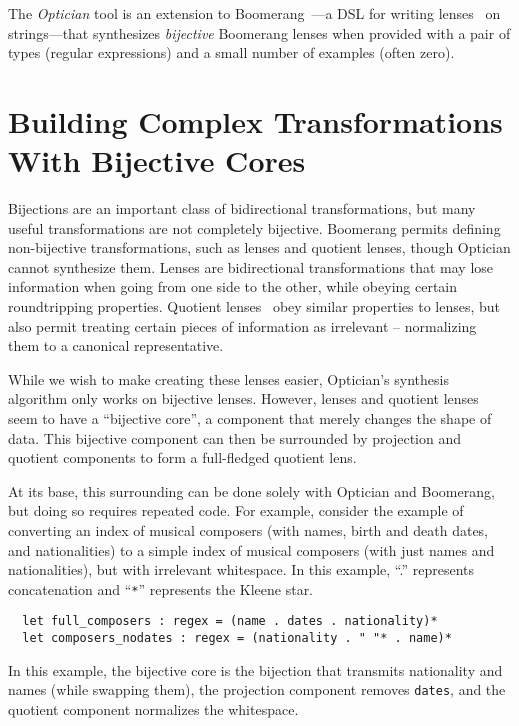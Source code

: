 \documentclass[a4paper]{article}
\begin{document}
The {\em Optician} tool is an extension to Boomerang~\cite{boomerang}---a
DSL for writing lenses~\cite{Focal2005-long2} on strings---that synthesizes
{\em bijective} Boomerang lenses when provided with a pair of types (regular
expressions) and a small number of examples (often zero).

\section{Building Complex Transformations With Bijective Cores}

Bijections are an important class of bidirectional transformations, but many
useful transformations are not completely bijective. Boomerang permits defining
non-bijective transformations, such as lenses and quotient lenses, though
Optician cannot synthesize them. Lenses are bidirectional transformations that
may lose information when going from one side to the other, while obeying
certain roundtripping properties. Quotient lenses~\cite{quotientlenses} obey
similar properties to lenses, but also permit treating certain pieces of
information as irrelevant -- normalizing them to a canonical representative.

While we wish to make creating these lenses easier, Optician's synthesis algorithm
only works on bijective lenses. However, lenses and quotient lenses seem to have
a ``bijective core'', a component that merely changes the shape of data.
This bijective component can then be surrounded by projection and quotient
components to form a full-fledged quotient lens.

At its base, this surrounding can be done solely with Optician and Boomerang,
but doing so requires repeated code. For example, consider the example of
converting an index of musical composers (with names, birth and death dates, and
nationalities) to a simple index of musical composers (with just names and
nationalities), but with irrelevant whitespace. In this example, ``.''
represents concatenation and ``\lstinline{*}'' represents the Kleene star.

\begin{lstlisting}
  let full_composers : regex = (name . dates . nationality)*
  let composers_nodates : regex = (nationality . " "* . name)*
\end{lstlisting}

In this example, the bijective core is the bijection that transmits nationality and
names (while swapping them), the projection component removes \lstinline{dates},
and the quotient component normalizes the whitespace.
\end{document}
